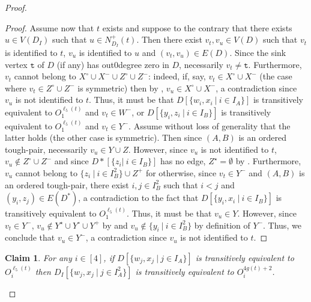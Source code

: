 \documentclass[a4paper,11pt]{article}
\theoremstyle{plain}
\newtheorem{claim}[theorem]{Claim}
\newtheorem{identification rule}{Identification Rule}
\theoremstyle{definition}
\theoremstyle{remark}
\newenvironment{claimproof}{\begin{proof}\renewcommand{\qedsymbol}{\claimqed}}{\end{proof}\renewcommand{\qedsymbol}{\plainqed}}
\let\plainqed\qedsymbol
\newcommand{\claimqed}{$\lrcorner$}
\newcommand{\toughpair}{tough-pair}
\newcommand{\ttt}{\texttt{t}}
\begin{document}
\begin{proof}
\begin{claimproof}
Assume now that $t$ exists and suppose to the contrary that there exists $u \in V(D_I)$ such that $u \in N^+_{D_I}(t)$.
Then there exist $v_t,v_u \in V(D)$ such that $v_t$ is identified to $t$, $v_u$ is identified to $u$ and $(v_t,v_u) \in E(D)$.
Since the sink vertex $\ttt$ of $D$ (if any) has out0degree zero in $D$, necessarily $v_t \neq \ttt$.
Furthermore, $v_t$ cannot belong to $X^\circ \cup X^- \cup Z^\circ \cup Z^-$: indeed, if, say, $v_t \in X^\circ \cup X^-$ (the case where $v_t \in Z^\circ \cup Z^-$ is symmetric) then by , $v_u \in X^\circ \cup X^-$,
a contradiction since $v_u$ is not identified to $t$.
Thus, it must be that $D[\{w_i,x_i~|~i \in I_A\}]$ is transitively equivalent to $O_1^{\ell_5(t)}$ and $v_t \in W^-$, or
$D[\{y_i,z_i~|~i \in I_B\}]$ is transitively equivalent to $O_1^{\ell_5(t)}$ and $v_t \in Y^-$.
Assume without loss of generality that the latter holds (the other case is symmetric).
Then since $(A,B)$ is an ordered \toughpair, necessarily $v_u \in Y \cup Z$.
However, since $v_u$ is not identified to $t$, $v_u \notin Z^\circ \cup Z^-$
and since $D*[\{z_i|~i \in I_B\}]$ has no edge, $Z^\star = \emptyset$ by .
Furthermore, $v_u$ cannot belong to $\{z_i~|~i \in I_B^2\} \cup Z^+$ for otherwise, since $v_t \in Y^-$ and $(A,B)$ is an ordered \toughpair, there exist $i,j \in I_B^2$ such that $i < j$ and $(y_i,z_j) \in E(D^*)$, a contradiction to the fact that $D[\{y_i,x_i~|~i \in I_B\}]$ is transitively equivalent to $O_1^{\ell_5(t)}$.
Thus, it must be that $v_u \in Y$.
However, since $v_t \in Y^-$, $v_u \notin Y^\star \cup Y^\circ \cup Y^+$ by 
and $v_u \notin \{y_i~|~i \in I_B^2\}$ by definition of $Y^-$.
Thus, we conclude that $v_u \in Y^-$, a contradiction since $v_u$ is not identified to $t$. 
\end{claimproof}

\begin{claim}
\label{clm:sameinDIWX}
For any $i \in [4]$, if $D[\{w_j,x_j~|~j\in I_A\}]$ is transitively equivalent to $O_i^{\ell_5(t)}$ then
$D_I[\{w_j,x_j~|~j \in I_A^2\}]$ is transitively equivalent to $O_i^{4g(t)+2}$.
\end{claim}


\end{proof}
\end{document}
